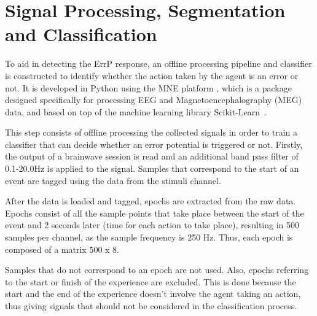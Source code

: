 \documentclass[journal]{IEEEtran}
\begin{document}
{%


\section{Signal Processing, Segmentation and Classification}
\label{section:calibration}

To aid in detecting the ErrP response, an offline processing pipeline and classifier is constructed to identify whether the action taken by the agent is an error or not. It is developed in Python using the MNE platform \cite{MNE-PYTHON}, which is a package designed specifically for processing EEG and Magnetoencephalography (MEG) data, and based on top of the machine learning library Scikit-Learn~\cite{scikit-learn}.

This step consists of offline processing the collected signals in order to train a classifier that can decide whether an error potential is triggered or not. Firstly, the output of a brainwave session is read and an additional band pass filter of 0.1-20.0Hz is applied to the signal. Samples that correspond to the start of an event are tagged using the data from the stimuli channel.

After the data is loaded and tagged, epochs are extracted from the raw data. Epochs consist of all the sample points that take place between the start of the event and 2 seconds later (time for each action to take place), resulting in 500 samples per channel, as the sample frequency is 250 Hz. Thus, each epoch is composed of a matrix $500$ x $8$.

Samples that do not correspond to an epoch are not used. Also, epochs referring to the start or finish of the experience are excluded. This is done because the start and the end of the experience doesn't involve the agent taking an action, thus giving signals that should not be considered in the classification process.

}
\end{document}
